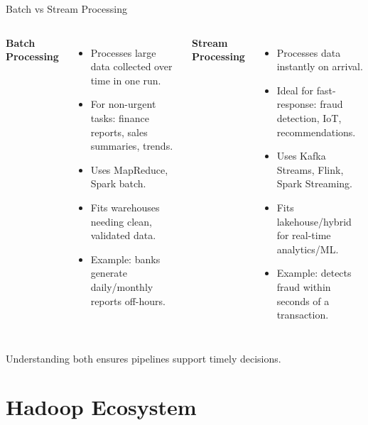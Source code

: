 \documentclass[aspectratio=169, table]{beamer}
\begin{document}
\begin{frame}{Batch vs Stream Processing}
	\vspace{10pt}
	
	\begin{columns}[T]
		\textbf{Batch Processing}
		\vspace{5pt}
		\begin{itemize}
			\item Processes large data collected over time in one run.
			\item For non-urgent tasks: finance reports, sales summaries, trends.
			\item Uses MapReduce, Spark batch.
			\item Fits warehouses needing clean, validated data.
			\item Example: banks generate daily/monthly reports off-hours.
		\end{itemize}
		
		\textbf{Stream Processing}
		\vspace{5pt}
		\begin{itemize}
			\item Processes data instantly on arrival.
			\item Ideal for fast-response: fraud detection, IoT, recommendations.
			\item Uses Kafka Streams, Flink, Spark Streaming.
			\item Fits lakehouse/hybrid for real-time analytics/ML.
			\item Example: detects fraud within seconds of a transaction.
		\end{itemize}
		
	\end{columns}
	
	\vspace{5pt}
	Understanding both ensures pipelines support timely decisions.
	
\end{frame}

\section{Hadoop Ecosystem}
\end{document}
